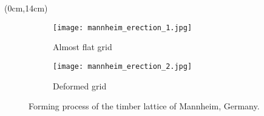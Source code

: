 \documentclass[fleqn]{thesis}
\begin{document}
	\begin{textblock*}{10cm}(0cm,14cm)%
		\setlength{\parskip}{0pt}
		\begin{figure}[t]
			\begin{subfigure}[b]{\TwoMediaWidth}
				\texttt{[image: mannheim\_erection\_1.jpg]}
				\caption{Almost flat grid}
				\label{fig:erec_1}
			\end{subfigure}%
			\hspace{\MediaGutterWidth}%
			\begin{subfigure}[b]{\TwoMediaWidth}
				\texttt{[image: mannheim\_erection\_2.jpg]}
				\caption{Deformed grid}
				\label{fig:erec_2}
			\end{subfigure}
			\caption[Forming process of the timber lattice of Mannheim, Germany]{Forming process of the timber lattice of Mannheim, Germany.}
			\label{fig:multihalle}
		\end{figure}
	\end{textblock*}



	\cleartoleftpage
	\kant[1-2]	

	\cleartoleftpage
	\kant[1-2]	

	\cleartoleftpage
	\kant[1-2]	

	\cleartoleftpage
	\kant[1-2]	




	
\end{document}
